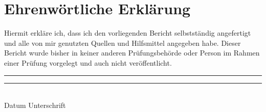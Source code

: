 \chapter*{Ehrenwörtliche Erklärung}

Hiermit erkläre ich, dass ich den vorliegenden Bericht selbstständig 
angefertigt und alle von mir genutzten Quellen und Hilfsmittel angegeben 
habe. Dieser Bericht wurde bisher in keiner anderen Prüfungsbehörde oder 
Person im Rahmen einer Prüfung vorgelegt und auch nicht veröffentlicht.

\vspace{5cm}

\rule{3.5cm}{1pt} \hspace{1.5cm} \rule{10cm}{1pt}\\
Datum \hspace{4cm} Unterschrift\\